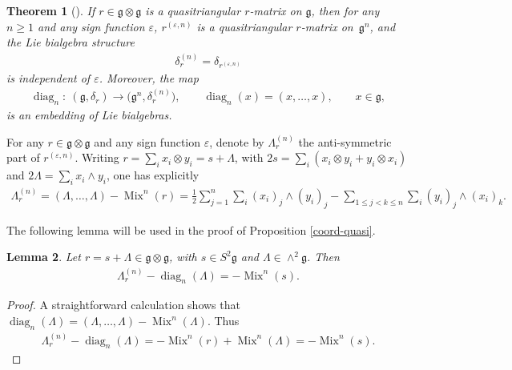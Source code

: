 \documentclass[pdftex]{sigma}
\numberwithin{equation}{section}
\newtheorem{Theorem}{Theorem}[section]
\newtheorem{Lemma}[Theorem]{Lemma}
\def \g {\mathfrak{a}}
\def \g {\mathfrak{g}}
\DeclareMathOperator{\diag}{diag}
\DeclareMathOperator{\Mix}{Mix}
\begin{document}
\begin{Theorem}[{\cite[Theorem 6.2]{Lu-Mou:mixed}}] \label{r^(n)}
If $r \in \g \otimes \g$ is a quasitriangular $r$-matrix on $\g$, then for any $n \geq 1$ and any sign function $\varepsilon$, $r^{(\varepsilon, n)}$ is a quasitriangular $r$-matrix on~$\g^n$, and the Lie bialgebra structure
\begin{gather}
\delta_r^{(n)} = \delta_{r^{(\varepsilon, n)}} \label{delta_r^n}
\end{gather}
is independent of $\varepsilon$. Moreover, the map
\begin{gather*}
\diag_n\colon \ (\g, \delta_r) \to \big(\g^n, \delta_r^{(n)}\big), \qquad \diag_n(x) = (x, \ldots, x), \qquad x \in \g, %
\end{gather*}
is an embedding of Lie bialgebras.
\end{Theorem}

For any $r \in \g \otimes \g$ and any sign function $\varepsilon$, denote by $\Lambda_r^{(n)}$ the anti-symmetric part of $r^{(\varepsilon, n)}$. Writing $r = \sum_i x_i \otimes y_i = s + \Lambda$, with $2s = \sum_i (x_i \otimes y_i + y_i \otimes x_i)$ and $2\Lambda = \sum_i x_i \wedge y_i$, one has explicitly
\begin{gather*}
\Lambda_r^{(n)} = (\Lambda, \ldots, \Lambda) - \Mix^n(r) = \frac{1}{2} \sum_{j=1}^n \sum_i (x_i)_j \wedge (y_i)_j - \sum_{1 \leq j < k \leq n} \sum_i (y_i)_j \wedge (x_i)_k. %
\end{gather*}

The following lemma will be used in the proof of Proposition \ref{coord-quasi}.

\begin{Lemma} \label{lem-diag_nLambda}
Let $r = s + \Lambda \in \g \otimes \g$, with $s \in S^2 \g$ and $\Lambda \in \wedge^2 \g$. Then
\begin{gather*}
\Lambda_r^{(n)} - \diag_n(\Lambda) = - \Mix^n(s). %
\end{gather*}
\end{Lemma}
\begin{proof}
A straightforward calculation shows that $\diag_n(\Lambda) = (\Lambda, \ldots, \Lambda) - \Mix^n(\Lambda)$. Thus
\begin{gather*}
\Lambda_r^{(n)} - \diag_n(\Lambda) = - \Mix^n(r) + \Mix^n(\Lambda) = - \Mix^n(s).\tag*{\qed}
\end{gather*}\renewcommand{\qed}{}
\end{proof}
\end{document}
